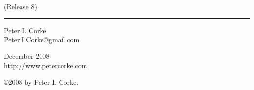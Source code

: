 \documentclass{article}
\begin{document}
\thispagestyle{empty}
%
%
%
\vspace*{\fill}

\vspace*{2cm}
{\Afon (Release 8)}\hfill{}                             %

\vspace*{\fill}
\hrule
\parbox{50mm}{{\Afon Peter I. Corke}\\
Peter.I.Corke@gmail.com} \hfill {\Afon December 2008}\\    %
http://www.petercorke.com
\newpage
\vspace*{\fill}
\setlength{\fboxsep}{10pt}%

\copyright 2008 by Peter I. Corke.                  %
\noindent
\cleardoublepage

\newcommand{\Mlab}{M\eightTR ATLAB}
\newcommand{\under}[1]{\underline{\rule[-.70ex]{0cm}{4mm}#1}}



\pagestyle{headings}        %


\newcommand{\be}{\begin{equation}}
\newcommand{\ee}{\end{equation}}
\newcommand{\bea}{\begin{eqnarray}}
\newcommand{\eea}{\end{eqnarray}}
\newcommand{\bi}{\begin{itemize}}
\newcommand{\ei}{\end{itemize}}
\newcommand{\ii}{\item}


\renewcommand{\baselinestretch}{1.2}        %

\newpage
{}
\vskip 4mm
\vskip 2mm
\moveleft 1.25in\vbox{}
\setcounter{section}{0}
\vskip 5mm
\end{document}
